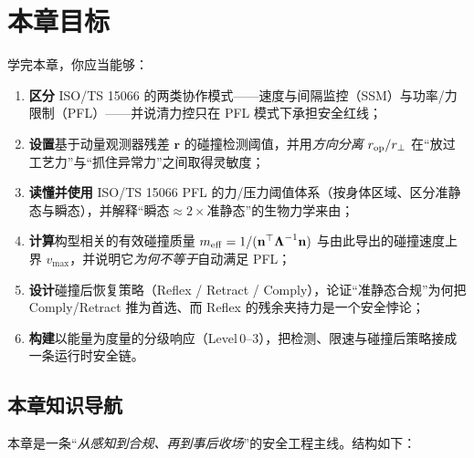 \section*{本章目标}
学完本章，你应当能够：
\begin{enumerate}
  \item \textbf{区分} ISO/TS 15066 的两类协作模式——速度与间隔监控（SSM）与功率/力限制（PFL）——并说清力控只在 PFL 模式下承担安全红线；
  \item \textbf{设置}基于动量观测器残差 $\mathbf r$ 的碰撞检测阈值，并用\emph{方向分离} $r_{\rm op}/r_\perp$ 在“放过工艺力”与“抓住异常力”之间取得灵敏度；
  \item \textbf{读懂并使用} ISO/TS 15066 PFL 的力/压力阈值体系（按身体区域、区分准静态与瞬态），并解释“瞬态$\approx 2\times$准静态”的生物力学来由；
  \item \textbf{计算}构型相关的有效碰撞质量 $m_{\rm eff}=1/(\mathbf n^\top\boldsymbol\Lambda^{-1}\mathbf n)$ 与由此导出的碰撞速度上界 $v_{\max}$，并说明它\emph{为何不等于}自动满足 PFL；
  \item \textbf{设计}碰撞后恢复策略（Reflex / Retract / Comply），论证“准静态合规”为何把 Comply/Retract 推为首选、而 Reflex 的残余夹持力是一个安全悖论；
  \item \textbf{构建}以能量为度量的分级响应（Level\,0--3），把检测、限速与碰撞后策略接成一条运行时安全链。
\end{enumerate}

\subsection*{本章知识导航}
本章是一条“\emph{从感知到合规、再到事后收场}”的安全工程主线。结构如下：

